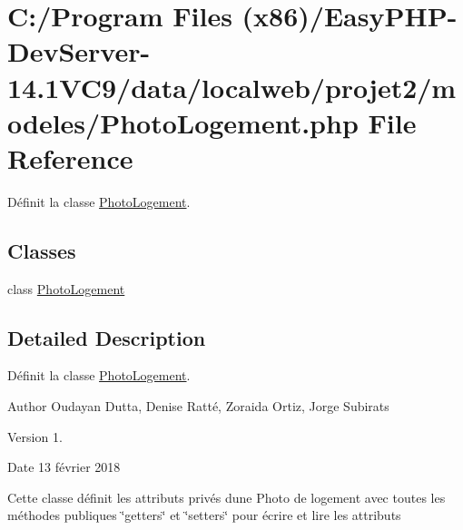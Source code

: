 \hypertarget{_photo_logement_8php}{}\section{C\+:/\+Program Files (x86)/\+Easy\+P\+H\+P-\/\+Dev\+Server-\/14.1\+V\+C9/data/localweb/projet2/modeles/\+Photo\+Logement.php File Reference}
\label{_photo_logement_8php}


Définit la classe \hyperlink{class_photo_logement}{Photo\+Logement}.  


\subsection*{Classes}
\begin{DoxyCompactItemize}
\item 
class \hyperlink{class_photo_logement}{Photo\+Logement}
\end{DoxyCompactItemize}


\subsection{Detailed Description}
Définit la classe \hyperlink{class_photo_logement}{Photo\+Logement}. 

\begin{DoxyAuthor}{Author}
Oudayan Dutta, Denise Ratté, Zoraida Ortiz, Jorge Subirats 
\end{DoxyAuthor}
\begin{DoxyVersion}{Version}
1. 
\end{DoxyVersion}
\begin{DoxyDate}{Date}
13 février 2018
\end{DoxyDate}
Cette classe définit les attributs privés d\textquotesingle{}une Photo de logement avec toutes les méthodes publiques \char`\"{}getters\char`\"{} et \char`\"{}setters\char`\"{} pour écrire et lire les attributs 